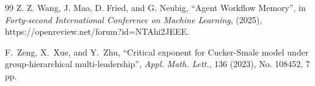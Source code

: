 \documentclass[11pt]{amsart}
\numberwithin{equation}{section}
\begin{document}
\begin{thebibliography}{99}
Z. Z. Wang, J. Mao, D. Fried, and G. Neubig, ``Agent Workflow Memory'', in  \textit{Forty-second International Conference on Machine Learning}, (2025), https://openreview.net/forum?id=NTAhi2JEEE.





F.~Zeng, X.~Xue, and Y.~Zhu,
``Critical exponent for Cucker-Smale model under group-hierarchical multi-leadership'',
\textit{Appl. Math. Lett.}, 136 (2023),  No. 108452, 7 pp.

\end{thebibliography}
\end{document}
